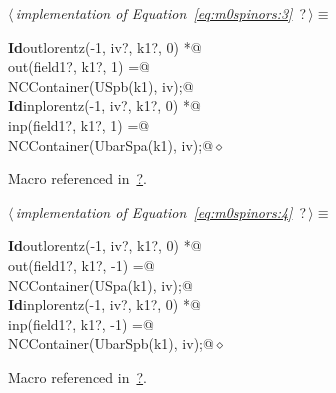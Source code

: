 \documentclass[a4paper,12pt]{amsart}
\renewcommand{\NWtarget}[2]{\hypertarget{#1}{#2}}
\renewcommand{\NWlink}[2]{\hyperlink{#1}{#2}}
\renewcommand{\NWtxtMacroRefIn}{Macro referenced in}
\renewcommand{\NWsep}{${\diamond}$}
\begin{document}
\begin{flushleft} \small
\begin{minipage}{\linewidth}\label{scrap11}\raggedright\small
\NWtarget{nuweb?}{} $\langle\,${\it implementation of Equation~\eqref{eq:m0spinors:3}}\nobreak\ {\footnotesize {?}}$\,\rangle\equiv$
\vspace{-1ex}
\begin{list}{}{} \item
\mbox{}\verb@@\hbox{\sffamily\bfseries Id}\verb@ outlorentz(-1, iv?, k1?, 0) *@\\
\mbox{}\verb@      out(field1?, k1?,  1) =@\\
\mbox{}\verb@   NCContainer(USpb(k1), iv);@\\
\mbox{}\verb@@\hbox{\sffamily\bfseries Id}\verb@ inplorentz(-1, iv?, k1?, 0) *@\\
\mbox{}\verb@      inp(field1?, k1?,  1) =@\\
\mbox{}\verb@   NCContainer(UbarSpa(k1), iv);@{\NWsep}
\end{list}
\vspace{-1.5ex}
\footnotesize
\begin{list}{}{\setlength{\itemsep}{-\parsep}\setlength{\itemindent}{-\leftmargin}}
\item \NWtxtMacroRefIn\ \NWlink{nuweb?}{?}.

\item{}
\end{list}
\end{minipage}\vspace{4ex}
\end{flushleft}
\begin{flushleft} \small
\begin{minipage}{\linewidth}\label{scrap12}\raggedright\small
\NWtarget{nuweb?}{} $\langle\,${\it implementation of Equation~\eqref{eq:m0spinors:4}}\nobreak\ {\footnotesize {?}}$\,\rangle\equiv$
\vspace{-1ex}
\begin{list}{}{} \item
\mbox{}\verb@@\hbox{\sffamily\bfseries Id}\verb@ outlorentz(-1, iv?, k1?, 0) *@\\
\mbox{}\verb@      out(field1?, k1?, -1) =@\\
\mbox{}\verb@   NCContainer(USpa(k1), iv);@\\
\mbox{}\verb@@\hbox{\sffamily\bfseries Id}\verb@ inplorentz(-1, iv?, k1?, 0) *@\\
\mbox{}\verb@      inp(field1?, k1?, -1) =@\\
\mbox{}\verb@   NCContainer(UbarSpb(k1), iv);@{\NWsep}
\end{list}
\vspace{-1.5ex}
\footnotesize
\begin{list}{}{\setlength{\itemsep}{-\parsep}\setlength{\itemindent}{-\leftmargin}}
\item \NWtxtMacroRefIn\ \NWlink{nuweb?}{?}.

\item{}
\end{list}
\end{minipage}\vspace{4ex}
\end{flushleft}
\end{document}
